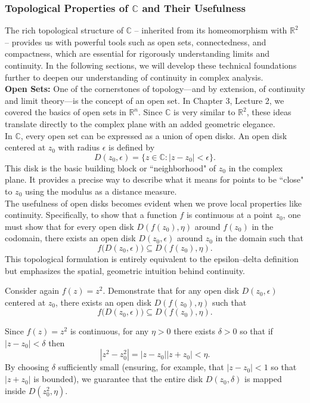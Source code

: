 \subsubsection*{Topological Properties of \(\mathbb{C}\) and Their Usefulness}

The rich topological structure of \(\mathbb{C}\) – inherited from its homeomorphism with \(\mathbb{R}^2\) – provides us with powerful tools such as open sets, connectedness, and compactness, which are essential for rigorously understanding limits and continuity. In the following sections, we will develop these technical foundations further to deepen our understanding of continuity in complex analysis.\\

\noindent \textbf{Open Sets:} \noindent One of the cornerstones of topology—and by extension, of continuity and limit theory—is the concept of an open set. In Chapter 3, Lecture 2, we covered the basics of open sets in \(\mathbb{R}^n\). Since \(\mathbb{C}\) is very similar to \(\mathbb{R}^2\), these ideas translate directly to the complex plane with an added geometric elegance.\\

\noindent In \(\mathbb{C}\), every open set can be expressed as a union of open disks. An open disk centered at \(z_0\) with radius \(\epsilon\) is defined by
\[
D(z_0, \epsilon) = \{ z \in \mathbb{C} : |z - z_0| < \epsilon \}.
\]
This disk is the basic building block or ``neighborhood" of \(z_0\) in the complex plane. It provides a precise way to describe what it means for points to be ``close" to \(z_0\) using the modulus as a distance measure. \\

\noindent The usefulness of open disks becomes evident when we prove local properties like continuity. Specifically, to show that a function \(f\) is continuous at a point \(z_0\), one must show that for every open disk \(D(f(z_0), \eta)\) around \(f(z_0)\) in the codomain, there exists an open disk \(D(z_0, \epsilon)\) around \(z_0\) in the domain such that
\[
f\bigl(D(z_0, \epsilon)\bigr) \subseteq D(f(z_0), \eta).
\]
This topological formulation is entirely equivalent to the epsilon–delta definition but emphasizes the spatial, geometric intuition behind continuity.

\exampleline
\begin{example}
Consider again \(f(z)=z^2\). Demonstrate that for any open disk \(D(z_0, \epsilon)\) centered at \(z_0\), there exists an open disk \(D(f(z_0), \eta)\) such that
\[
f\bigl(D(z_0, \epsilon)\bigr) \subseteq D(f(z_0), \eta).
\]
\begin{solution}
Since \(f(z)=z^2\) is continuous, for any \(\eta > 0\) there exists \(\delta > 0\) so that if \(|z-z_0| < \delta\) then
\[
|z^2-z_0^2| = |z-z_0||z+z_0| < \eta.
\]
By choosing \(\delta\) sufficiently small (ensuring, for example, that \(|z-z_0| < 1\) so that \(|z+z_0|\) is bounded), we guarantee that the entire disk \(D(z_0, \delta)\) is mapped inside \(D(z_0^2, \eta)\). 
\end{solution}
\end{example}
\exampleline

